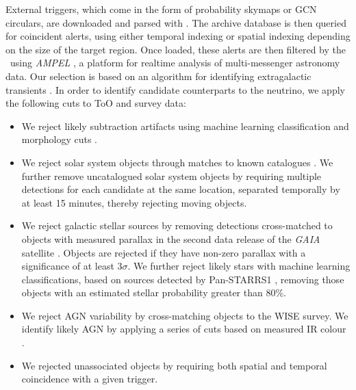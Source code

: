 External triggers, which come in the form of probability skymaps or GCN circulars, are downloaded and parsed with \ztf. The archive database is then queried for coincident alerts, using either temporal indexing or spatial indexing depending on the size of the target region. Once loaded, these alerts are then filtered by the \ztf~using \emph{AMPEL} , a platform for realtime analysis of multi-messenger astronomy data. Our selection is based on an algorithm for identifying extragalactic transients \cite{2019A&A...631A.147N}. In order to identify candidate counterparts to the neutrino, we apply the following cuts to ToO and survey data:

\begin{itemize}
	\item We reject likely subtraction artifacts using machine learning classification and morphology cuts .
	\item We reject solar system objects through matches to known catalogues \cite{2019PASP..131a8003M}. We further remove uncatalogued solar system objects by requiring multiple detections for each candidate at the same location, separated temporally by at least 15 minutes, thereby rejecting moving objects.
	\item We reject galactic stellar sources by removing detections cross-matched to objects with measured parallax in the second data release of the \emph{GAIA} satellite . Objects are rejected if they have non-zero parallax with a significance of at least 3$\sigma$. We further reject likely stars with machine learning classifications, based on sources detected by Pan-STARRS1 , removing those objects with an estimated stellar probability greater than 80\%. 
	\item We reject AGN variability by cross-matching objects to the WISE survey. We identify likely AGN by applying a series of cuts based on measured IR colour .
	\item We rejected unassociated objects by requiring both spatial and temporal coincidence with a given trigger.
\end{itemize}

